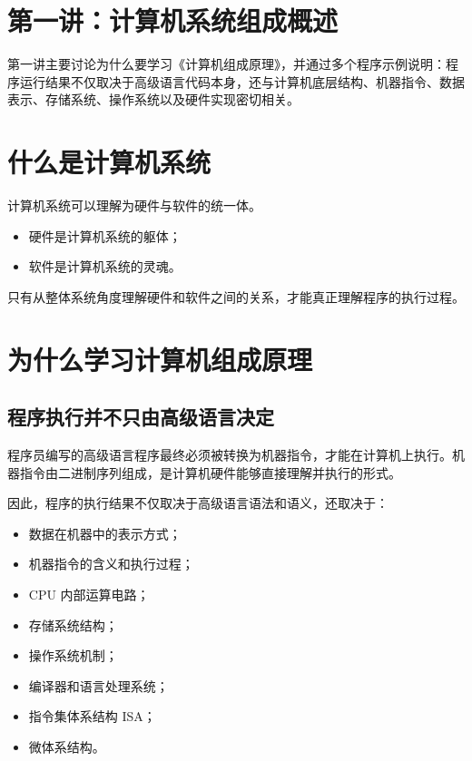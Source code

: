\documentclass[12pt,a4paper]{ctexart}
\begin{document}
\section{第一讲：计算机系统组成概述}

第一讲主要讨论为什么要学习《计算机组成原理》，并通过多个程序示例说明：程序运行结果不仅取决于高级语言代码本身，还与计算机底层结构、机器指令、数据表示、存储系统、操作系统以及硬件实现密切相关。

\section{什么是计算机系统}

计算机系统可以理解为硬件与软件的统一体。

\begin{itemize}
    \item 硬件是计算机系统的躯体；
    \item 软件是计算机系统的灵魂。
\end{itemize}

只有从整体系统角度理解硬件和软件之间的关系，才能真正理解程序的执行过程。

\section{为什么学习计算机组成原理}

\subsection{程序执行并不只由高级语言决定}

程序员编写的高级语言程序最终必须被转换为机器指令，才能在计算机上执行。机器指令由二进制序列组成，是计算机硬件能够直接理解并执行的形式。

因此，程序的执行结果不仅取决于高级语言语法和语义，还取决于：

\begin{itemize}
    \item 数据在机器中的表示方式；
    \item 机器指令的含义和执行过程；
    \item CPU 内部运算电路；
    \item 存储系统结构；
    \item 操作系统机制；
    \item 编译器和语言处理系统；
    \item 指令集体系结构 ISA；
    \item 微体系结构。
\end{itemize}
\end{document}
